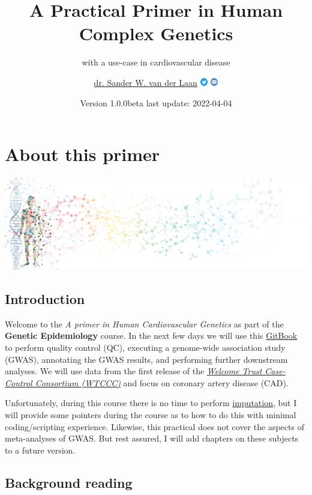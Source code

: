 \documentclass[
]{book}
\title{A Practical Primer in Human Complex Genetics}
\subtitle{with a use-case in cardiovascular disease}
\author{\href{https://swvanderlaan.github.iio}{dr. Sander W. van der Laan} \href{https://www.twitter.com/swvanderlaan}{\includegraphics[width=0.025\textwidth,height=\textheight]{img/twitter_circle_blue.png}} \href{mailto:s.w.vanderlaan@gmail.com}{\includegraphics[width=0.025\textwidth,height=\textheight]{img/email_circle_blue.png}}}
\date{Version 1.0.0beta \textbar{} last update: 2022-04-04}
\begin{document}
\maketitle

{
\setcounter{tocdepth}{1}
\tableofcontents
}
\hypertarget{about-this-primer}{%
\chapter{About this primer}\label{about-this-primer}}

\includegraphics{img/banner_man_standing_dna.png}

\hypertarget{introduction}{%
\section{Introduction}\label{introduction}}

Welcome to the \emph{A primer in Human Cardiovascular Genetics} as part of the \textbf{Genetic Epidemiology} course. In the next few days we will use this \href{https://cjvanlissa.github.io/gitbook-demo/}{GitBook} to perform quality control (QC), executing a genome-wide association study (GWAS), annotating the GWAS results, and performing further downstream analyses. We will use data from the first release of the \href{https://www.wtccc.org.uk/ccc1/overview.html}{\emph{Welcome Trust Case-Control Consortium (WTCCC)}} and focus on coronary artery disease (CAD).

Unfortunately, during this course there is no time to perform \href{https://www.nature.com/articles/nrg2796}{imputation}, but I will provide some pointers during the course as to how to do this with minimal coding/scripting experience. Likewise, this practical does not cover the aspects of meta-analyses of GWAS. But rest assured, I will add chapters on these subjects to a future version.

\hypertarget{background-reading}{%
\section{Background reading}\label{background-reading}}
\end{document}
